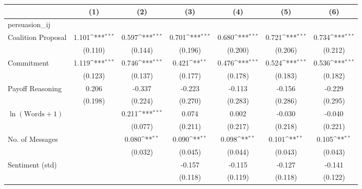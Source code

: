 \renewcommand{\arraystretch}{0.85}
\def\sym#1{\ifmmode^{#1}\else\(^{#1}\)\fi}
\begin{tabular}{lcccccc}
\toprule
                &\multicolumn{1}{c}{(1)}         &\multicolumn{1}{c}{(2)}         &\multicolumn{1}{c}{(3)}         &\multicolumn{1}{c}{(4)}         &\multicolumn{1}{c}{(5)}         &\multicolumn{1}{c}{(6)}         \\
\midrule
persuasion\_ij   &                  &                  &                  &                  &                  &                  \\
Coalition Proposal&    1.101\sym{***}&    0.597\sym{***}&    0.701\sym{***}&    0.680\sym{***}&    0.721\sym{***}&    0.734\sym{***}\\
                &  (0.110)         &  (0.144)         &  (0.196)         &  (0.200)         &  (0.206)         &  (0.212)         \\
Commitment      &    1.119\sym{***}&    0.746\sym{***}&    0.421\sym{**} &    0.476\sym{***}&    0.524\sym{***}&    0.536\sym{***}\\
                &  (0.123)         &  (0.137)         &  (0.177)         &  (0.178)         &  (0.183)         &  (0.182)         \\
Payoff Reasoning&    0.206         &   -0.337         &   -0.223         &   -0.113         &   -0.156         &   -0.229         \\
                &  (0.198)         &  (0.224)         &  (0.270)         &  (0.283)         &  (0.286)         &  (0.295)         \\
$\ln(\text{Words} + 1)$&                  &    0.211\sym{***}&    0.074         &    0.002         &   -0.030         &   -0.040         \\
                &                  &  (0.077)         &  (0.211)         &  (0.217)         &  (0.218)         &  (0.221)         \\
No. of Messages &                  &    0.080\sym{**} &    0.090\sym{**} &    0.098\sym{**} &    0.101\sym{**} &    0.105\sym{**} \\
                &                  &  (0.032)         &  (0.045)         &  (0.044)         &  (0.043)         &  (0.043)         \\
Sentiment (std) &                  &                  &   -0.157         &   -0.115         &   -0.127         &   -0.141         \\
                &                  &                  &  (0.118)         &  (0.119)         &  (0.118)         &  (0.122)         \\

\end{tabular}
